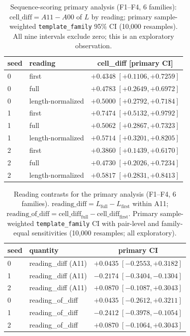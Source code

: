 \documentclass[11pt,a4paper]{article}
\begin{document}
\begin{table}[t]
\centering
\caption{Sequence-scoring primary analysis (F1--F4, 6 families):
$\mathrm{cell\_diff}=A11-A00$ of $L$ by reading; primary
sample-weighted \texttt{template\_family} 95\% CI (10{,}000 resamples). All
nine intervals exclude zero; this is an exploratory observation.}
\label{tab:seqcell}
\begin{tabular}{llc}
\toprule
seed & reading & cell\_diff [primary CI] \\
\midrule
0 & first & $+0.4348\;[+0.1106,+0.7259]$ \\
0 & full & $+0.4783\;[+0.2649,+0.6972]$ \\
0 & length-normalized & $+0.5000\;[+0.2792,+0.7184]$ \\
1 & first & $+0.7474\;[+0.5132,+0.9792]$ \\
1 & full & $+0.5062\;[+0.2867,+0.7323]$ \\
1 & length-normalized & $+0.5714\;[+0.3201,+0.8205]$ \\
2 & first & $+0.3860\;[+0.1439,+0.6170]$ \\
2 & full & $+0.4730\;[+0.2026,+0.7234]$ \\
2 & length-normalized & $+0.5817\;[+0.2831,+0.8413]$ \\
\bottomrule
\end{tabular}
\end{table}

\begin{table}[t]
\centering
\caption{Reading contrasts for the primary analysis (F1--F4, 6 families).
$\mathrm{reading\_diff}=L_{\mathrm{full}}-L_{\mathrm{first}}$ within A11;
$\mathrm{reading\_of\_diff}=\mathrm{cell\_diff}_{\mathrm{full}}-\mathrm{cell\_diff}_{\mathrm{first}}$.
Primary sample-weighted \texttt{template\_family} CI with pair-level and
family-equal sensitivities (10{,}000 resamples; all exploratory).}
\label{tab:seqdiff}
\begin{tabular}{llc}
\toprule
seed & quantity & primary CI \\
\midrule
0 & reading\_diff (A11) & $+0.0435\;[-0.2553,+0.3182]$ \\
1 & reading\_diff (A11) & $-0.2174\;[-0.3404,-0.1304]$ \\
2 & reading\_diff (A11) & $+0.0870\;[-0.1087,+0.3043]$ \\
0 & reading\_of\_diff & $+0.0435\;[-0.2612,+0.3211]$ \\
1 & reading\_of\_diff & $-0.2412\;[-0.3978,-0.1054]$ \\
2 & reading\_of\_diff & $+0.0870\;[-0.1064,+0.3043]$ \\
\bottomrule
\end{tabular}
\end{table}
\end{document}
